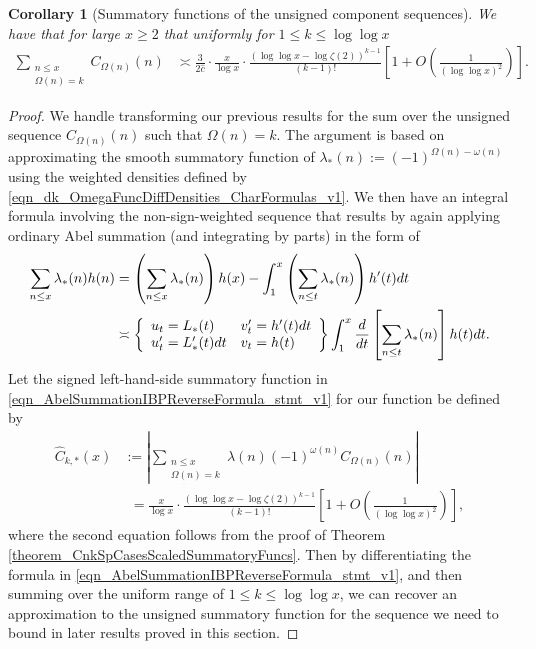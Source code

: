 \documentclass[11pt,reqno,a4letter]{article}
\numberwithin{figure}{section}
\numberwithin{table}{section}
\theoremstyle{plain}
\newtheorem{cor}[theorem]{Corollary}
\numberwithin{theorem}{section}
\theoremstyle{definition}
\begin{document}
\begin{cor}[Summatory functions of the unsigned component sequences] 
\label{cor_SummatoryFuncsOfUnsignedSeqs_v2} 
We have that for large $x \geq 2$ that uniformly for $1 \leq k \leq \log\log x$ 
\begin{align*} 
\sum_{\substack{n \leq x \\ \Omega(n) = k}} C_{\Omega(n)}(n) & \asymp 
    \frac{3}{2\hat{c}} \cdot \frac{x}{\log x} \cdot 
     \frac{(\log\log x - \log\zeta(2))^{k-1}}{(k-1)!} \left[1 + O\left(\frac{1}{(\log\log x)^2}\right) 
     \right]. 
\end{align*} 
\end{cor} 
\begin{proof} 
We handle transforming our previous results for the sum over the unsigned sequence 
$C_{\Omega(n)}(n)$ such that $\Omega(n) = k$. 
The argument is based on approximating the smooth summatory function of 
$\lambda_{\ast}(n) := (-1)^{\Omega(n) - \omega(n)}$ using the weighted 
densities defined by \eqref{eqn_dk_OmegaFuncDiffDensities_CharFormulas_v1}. 
We then have an integral formula involving the non-sign-weighted 
sequence that results by again 
applying ordinary Abel summation (and integrating by parts) in the form of 
\begin{align} 
\label{eqn_AbelSummationIBPReverseFormula_stmt_v1} 
\sum_{n \leq x} \lambda_{\ast}(n) h(n) & = \left(\sum_{n \leq x} \lambda_{\ast}(n)\right) h(x) - 
     \int_{1}^{x} \left(\sum_{n \leq t} \lambda_{\ast}(n)\right) h^{\prime}(t) dt \\ 
\notag 
     & \asymp \left\{\begin{array}{ll} 
     u_t = L_{\ast}(t) & v_t^{\prime} = h^{\prime}(t) dt \\ 
     u_t^{\prime} = L_{\ast}^{\prime}(t) dt & v_t = h(t) 
     \end{array} 
     \right\} 
     \int_1^{x} \frac{d}{dt}\left[\sum_{n \leq t} \lambda_{\ast}(n)\right] h(t) dt. 
\end{align} 
Let the signed left-hand-side summatory function in 
\eqref{eqn_AbelSummationIBPReverseFormula_stmt_v1} for our function be defined by 
\begin{align*} 
\widehat{C}_{k,\ast}(x) & := \left\lvert \sum_{\substack{n \leq x \\ \Omega(n)=k}} 
     \lambda(n) (-1)^{\omega(n)} C_{\Omega(n)}(n) \right\rvert \\ 
     & \phantom{:} = 
     \frac{x}{\log x} \cdot \frac{(\log\log x - \log\zeta(2))^{k-1}}{(k-1)!} \left[ 
     1 + O\left(\frac{1}{(\log\log x)^2}\right)\right], 
\end{align*} 
where the second equation follows from the proof of 
Theorem \ref{theorem_CnkSpCasesScaledSummatoryFuncs}. 
Then by differentiating the formula in 
\eqref{eqn_AbelSummationIBPReverseFormula_stmt_v1}, and 
then summing over the uniform range of $1 \leq k \leq \log\log x$, 
we can recover an approximation to the unsigned summatory function for the 
sequence we need to bound in later results proved in this section. 


\end{proof}
\end{document}
